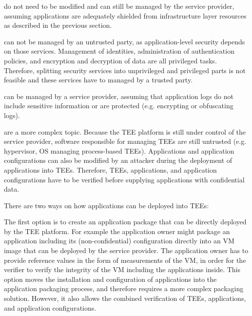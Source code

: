 \begin{description}[style=standard]
  \item[Infrastructure Management Services] do not need to be modified and can
    still be managed by the service provider, assuming applications are
    adequately shielded from infrastructure layer resources as described in the
    previous section.

  \item[Security Services] can not be managed by an untrusted party, as
    application-level security depends on those services. Management of
    identities, administration of authentication policies, and encryption and
    decryption of data are all privileged tasks. Therefore, splitting security
    services into unprivileged and privileged parts is not feasible and these
    services have to managed by a trusted party.

  \item[Monitoring and Logging Services] can be managed by a service provider,
    assuming that application logs do not include sensitive information or are
    protected (e.g. encrypting or obfuscating logs).

  \item[Application Orchestration Services] are a more complex topic. Because
    the TEE platform is still under control of the service provider, software
    responsible for managing TEEs are still untrusted (e.g. hypervisor, OS
    managing process-based TEEs). Applications and application configurations
    can also be modified by an attacker during the deployment of applications
    into TEEs. Therefore, TEEs, applications, and application configurations
    have to be verified before supplying applications with confidential data.

    There are two ways on how applications can be deployed into TEEs:

    The first option is to create an application package that can be directly
    deployed by the TEE platform. For example the application owner might
    package an application including its (non-confidential) configuration
    directly into an VM image that can be deployed by the service provider. The
    application owner has to provide reference values in the form of
    measurements of the VM, in order for the verifier to verify the integrity of
    the VM including the applications inside. This option moves the installation
    and configuration of applications into the application packaging process,
    and therefore requires a more complex packaging solution. However, it also
    allows the combined verification of TEEs, applications, and application
    configurations.


\end{description}
